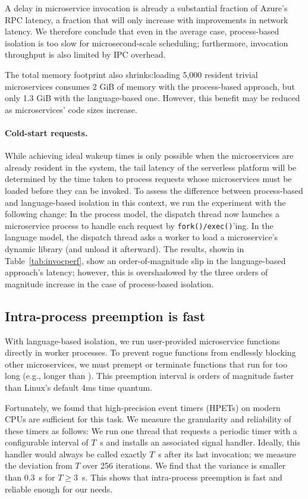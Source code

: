 A  delay in microservice invocation is already a substantial fraction of
Azure's  RPC latency, a fraction that will only increase with
improvements in network latency. We therefore conclude that even in the average case,
process-based isolation is too slow for microsecond-scale scheduling; furthermore,
invocation throughput is also limited by IPC overhead.

The total memory footprint also shrinks:\@ loading 5,000 resident
trivial microservices consumes 2 GiB of memory with the process-based approach, but
only 1.3 GiB with the language-based one.  However, this benefit may be reduced as
microservices' code sizes increase.

\paragraph{Cold-start requests.}
While achieving ideal wakeup times is only possible when the microservices are
already resident in the system, the tail latency of the serverless platform will be
determined by the time taken to process requests whose microservices must be loaded
before they can be invoked.  To assess the difference between process-based and
language-based isolation in this context, we run the experiment with the following
change:  In the process model, the dispatch thread now launches a microservice
process to handle each request by \texttt{fork()/exec()}'ing.  In the language model,
the dispatch thread asks a worker to load a microservice's dynamic library (and
unload it afterward).  The results, showin in Table~\ref{tab:invocperf}, show an
order-of-magnitude slip in the language-based approach's latency; however, this is
overshadowed by the three orders of magnitude increase in the case of process-based
isolation.

\subsection{Intra-process preemption is fast}
With language-based isolation, we run user-provided microservice functions
directly in worker processes. To prevent rogue functions from endlessly blocking
other microservices, we must premept or terminate functions that run for too
long (e.g., longer than ).  This preemption interval is orders of
magnitude faster than Linux's default 4ms time quantum.

Fortunately, we found that high-precision event timers (HPETs) on modern CPUs
are sufficient for this task. We measure the granularity and reliability of
these timers as follows: We run one thread that requests a periodic timer with a
configurable interval of $T$~\textmu{}s and installs an associated signal handler.
Ideally, this handler would always be called exactly $T$~\textmu{}s after its last
invocation; we measure the deviation from $T$ over 256 iterations.
We find that the variance
is smaller than 0.3~\textmu{}s for $T \ge 3$~\textmu{}s. This shows that
intra-process preemption is fast and reliable enough for our needs.
